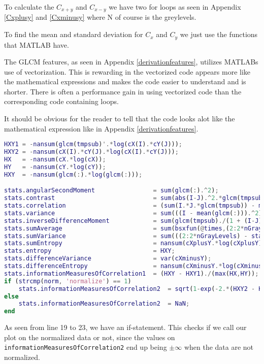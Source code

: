To calculate the $C_{x+y}$ and $C_{x-y}$ we have two for loops as seen in Appendix \ref{Cxplusy} and \ref{Cxminusy} where N of course is the greylevels. 

To find the mean and standard deviation for $C_x$ and $C_y$ we just use the functions that MATLAB have.

The GLCM features, as seen in Appendix \ref{derivationfeatures}, utilizes MATLABs use of vectorization. This is rewarding in the vectorized code appears more like the mathematical expressions and makes the code easier to understand and is shorter. There is often a performance gain in using vectorized code than the corresponding code containing loops.

It should be obvious for the reader to tell that the code looks alot like the mathematical expression like in Appendix \ref{derivationfeatures}.

\begin{lstlisting}[language=Matlab]
HXY1 = -nansum(glcm(tmpsub)'.*log(cX(I).*cY(J)));
HXY2 = -nansum(cX(I).*cY(J).*log(cX(I).*cY(J)));
HX   = -nansum(cX.*log(cX));
HY   = -nansum(cY.*log(cY));
HXY  = -nansum(glcm(:).*log(glcm(:)));

stats.angularSecondMoment                = sum(glcm(:).^2);
stats.contrast                           = sum(abs(I-J).^2.*glcm(tmpsub));
stats.correlation                        = (sum(I.*J.*glcm(tmpsub)) - muX*muY) ./ (stdX*stdY);
stats.variance                           = sum(((I - mean(glcm(:))).^2).*glcm(tmpsub));
stats.inverseDifferenceMoment            = sum(glcm(tmpsub)./(1 + (I-J).^2));
stats.sumAverage                         = sum(bsxfun(@times,(2:2*nGrayLevels)',cXplusY));
stats.sumVariance                        = sum(((2:2*nGrayLevels) - stats.sumAverage)'.^2.*cXplusY((2:2*nGrayLevels)-1,1));
stats.sumEntropy                         = nansum(cXplusY.*log(cXplusY));
stats.entropy                            = HXY;
stats.differenceVariance                 = var(cXminusY);
stats.differenceEntropy                  = nansum(cXminusY.*log(cXminusY));
stats.informationMeasuresOfCorrelation1  = (HXY - HXY1)./(max(HX,HY));
if (strcmp(norm, 'normalize') == 1)
    stats.informationMeasuresOfCorrelation2  = sqrt(1-exp(-2.*(HXY2 - HXY)));
else
    stats.informationMeasuresOfCorrelation2  = NaN;
end
\end{lstlisting}


As seen from line 19 to 23, we have an if-statement. This checks if we call our plot on the normalized data or not, since the values on \texttt{informationMeasuresOfCorrelation2} end up being $\pm \infty$ when the data are not normalized. 


